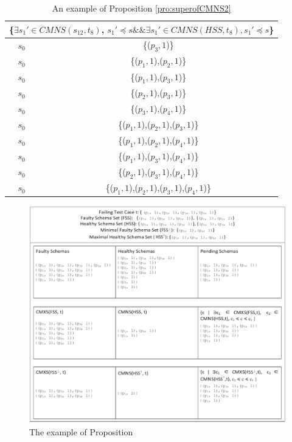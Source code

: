 { \begin{table}[htbp]
  \centering
  \caption{An example of Proposition \ref{pro:superofCMNS2}}
  \label{examleOfCMNSPro2}
    \begin{tabular}{|c|c|} \hline
   \multicolumn{2}{|c|}{\{$\exists s_{1}' \in CMNS(s_{12}, t_{8})$, $s_{1}' \preceq s \&\& \exists s_{1}' \in CMNS(HSS, t_{8}), s_{1}' \preceq s$\}}\\ \hline
   $s_{0}$ & \{($p_{3}, 1$)\} \\

   $s_{0}$ & \{($p_{1}, 1$),($p_{2}, 1$)\} \\
   $s_{0}$ & \{($p_{1}, 1$),($p_{3}, 1$)\} \\
   $s_{0}$ & \{($p_{2}, 1$),($p_{3}, 1$)\} \\
   $s_{0}$ & \{($p_{3}, 1$),($p_{4}, 1$)\} \\

   $s_{0}$ & \{($p_{1}, 1$),($p_{2}, 1$),($p_{3}, 1$)\} \\
   $s_{0}$ & \{($p_{1}, 1$),($p_{2}, 1$),($p_{4}, 1$)\} \\
   $s_{0}$ & \{($p_{1}, 1$),($p_{3}, 1$),($p_{4}, 1$)\} \\
   $s_{0}$ & \{($p_{2}, 1$),($p_{3}, 1$),($p_{4}, 1$)\} \\


   $s_{0}$ & \{($p_{1}, 1$),($p_{2}, 1$),($p_{3}, 1$),($p_{4}, 1$)\} \\  \hline
    \end{tabular}%
\end{table}


\begin{figure}[ht]
 \centering
 \includegraphics[width=5.6in]{minmax.pdf}
 \caption{The example of Proposition }
 \label{fig_minmax}
\end{figure}


}
